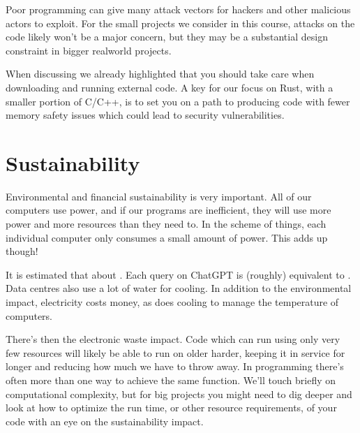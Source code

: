 \documentclass[letterpaper,10pt,british]{sphinxmanual}
\begin{document}
\sphinxAtStartPar
Poor programming can give many attack vectors for hackers and other malicious actors to exploit. For the small projects we consider in this course, attacks on the code likely won’t be a major concern, but they may be a substantial design constraint in bigger real\sphinxhyphen{}world projects.

\sphinxAtStartPar
When discussing {\hyperref[\detokenize{chapters/software_development_tools/libraries:code-security}]{}} we already highlighted that you should take care when downloading and running external code. A key {\hyperref[\detokenize{chapters/motivation/our_choices:motivation}]{}} for our focus on Rust, with a smaller portion of C/C++, is to set you on a path to producing code with fewer memory safety issues which could lead to security vulnerabilities.


\section{Sustainability}
\label{\detokenize{chapters/wider_factors:sustainability}}
\sphinxAtStartPar
Environmental and financial sustainability is very important. All of our computers use power, and if our programs are inefficient, they will use more power and more resources than they need to. In the scheme of things, each individual computer only consumes a small amount of power. This adds up though!

\sphinxAtStartPar
It is estimated that about . Each query on ChatGPT is (roughly) equivalent to . Data centres also use a lot of water for cooling. In addition to the environmental impact, electricity costs money, as does cooling to manage the temperature of computers.

\sphinxAtStartPar
There’s then the electronic waste impact. Code which can run using only very few resources will likely be able to run on older harder, keeping it in service for longer and reducing how much we have to throw away. In programming there’s often more than one way to achieve the same function. We’ll touch briefly on computational complexity, but for big projects you might need to dig deeper and look at how to optimize the run time, or other resource requirements, of your code with an eye on the sustainability impact.
\end{document}
